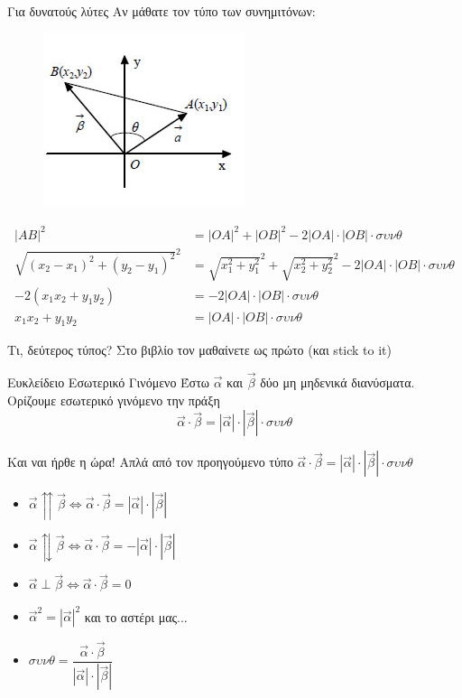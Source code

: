 \documentclass[greek]{beamer}
\begin{document}
\begin{frame}{Για δυνατούς λύτες}
  Αν μάθατε τον τύπο των συνημιτόνων:
  \begin{figure}
    \centering
    \includegraphics[width=0.35 \textwidth]{"../images/dotproductproof"}
  \end{figure}
  \begin{align*}
    |AB|^2                           & =|OA|^2+|OB|^2-2|OA|\cdot|ΟΒ|\cdot συνθ                             \\
    \sqrt{(x_2-x_1)^2+(y_2-y_1)^2}^2 & =\sqrt{x_1^2+y_1^2}^2+\sqrt{x_2^2+y_2^2}^2-2|OA|\cdot|ΟΒ|\cdot συνθ \\
    -2(x_1x_2+y_1y_2)                & =-2|OA|\cdot|ΟΒ|\cdot συνθ                                          \\
    x_1x_2+y_1y_2                    & =|OA|\cdot|ΟΒ|\cdot συνθ
  \end{align*}
\end{frame}

\begin{frame}{Τι, δεύτερος τύπος?}
  Στο βιβλίο τον μαθαίνετε ως πρώτο (και stick to it)
  \begin{block}{Ευκλείδειο Εσωτερικό Γινόμενο}
    Έστω $\vec{α}$ και $\vec{β}$ δύο μη μηδενικά διανύσματα. Ορίζουμε εσωτερικό γινόμενο την πράξη
    $$\vec{α}\cdot\vec{β} = |\vec{α}|\cdot|\vec{β}|\cdot συνθ$$
  \end{block}

\end{frame}

\begin{frame}{Και ναι ήρθε η ώρα!}
  Απλά από τον προηγούμενο τύπο $\vec{α}\cdot\vec{β} = |\vec{α}|\cdot|\vec{β}|\cdot συνθ$
  \begin{itemize}
    \item<1-> $\vec{α}\upuparrows\vec{β}\iff \vec{α}\cdot\vec{β} = |\vec{α}|\cdot|\vec{β}|$
    \item<2-> $\vec{α}\updownarrows\vec{β}\iff \vec{α}\cdot\vec{β} = -|\vec{α}|\cdot|\vec{β}|$
    \item<3-> $\vec{α}\perp\vec{β}\iff \vec{α}\cdot\vec{β} = 0$
    \item<4-> $\vec{α}^2=|\vec{α}|^2$
           {και το αστέρι μας...}
    \item<6-> $συνθ=\dfrac{\vec{α}\cdot\vec{β}}{|\vec{α}|\cdot|\vec{β}|}$
  \end{itemize}
\end{frame}
\end{document}
